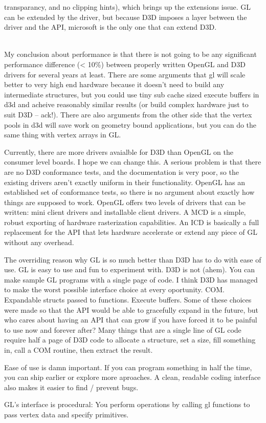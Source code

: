 \begin{allintypewriter}
transparancy, and no clipping hints), which brings up the extensions issue. GL can be 
extended by the driver, but because D3D imposes a layer between the driver and the API, 
microsoft is the only one that can extend D3D.\\ \\ 
\par
My conclusion about performance is that there is not going to be any significant 
performance difference (< 10\%) between properly written OpenGL and D3D drivers for several 
years at least. There are some arguments that gl will scale better to very high end hardware 
because it doesn't need to build any intermediate structures, but you could use tiny sub 
cache sized execute buffers in d3d and acheive reasonably similar results (or build complex 
hardware just to suit D3D -- ack!). There are also arguments from the other side that the 
vertex pools in d3d will save work on geometry bound applications, but you can do the same 
thing with vertex arrays in GL.\\ 
\par
Currently, there are more drivers avaialble for D3D than OpenGL on the consumer level boards. 
I hope we can change this. A serious problem is that there are no D3D conformance tests, and 
the documentation is very poor, so the existing drivers aren't exactly uniform in their 
functionality. OpenGL has an established set of conformance tests, so there is no argument 
about exactly how things are supposed to work. OpenGL offers two levels of drivers that can be 
written: mini client drivers and installable client drivers. A MCD is a simple, robust exporting 
of hardware rasterization capabilities. An ICD is basically a full replacement for the API that 
lets hardware accelerate or extend any piece of GL without any overhead.\\ 
\par
The overriding reason why GL is so much better than D3D has to do with ease of use. GL is easy 
to use and fun to experiment with. D3D is not (ahem). You can make sample GL programs with a 
single page of code. I think D3D has managed to make the worst possible interface choice at every 
oportunity. COM. Expandable structs passed to functions. Execute buffers. Some of these choices 
were made so that the API would be able to gracefully expand in the future, but who cares about 
having an API that can grow if you have forced it to be painful to use now and forever after? Many 
things that are a single line of GL code require half a page of D3D code to allocate a structure, 
set a size, fill something in, call a COM routine, then extract the result.\\ 
\par
Ease of use is damn important. If you can program something in half the time, you can ship earlier or 
explore more aproaches. A clean, readable coding interface also makes it easier to find / prevent bugs.\\ 
\par
GL's interface is procedural: You perform operations by calling gl functions to pass vertex data and 
specify primitives.\\ 
\par


\end{allintypewriter}
